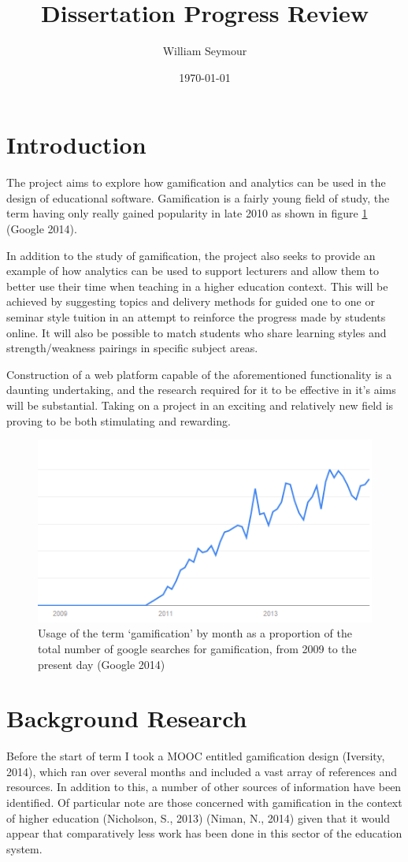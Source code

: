 \documentclass[10pt,a4paper]{report}
\author{William Seymour}
\title{Dissertation Progress Review}
\date{\today}
\begin{document}
\maketitle

\section*{Introduction}
The project aims to explore how gamification and analytics can be used in the design of educational software. Gamification is a fairly young field of study, the term having only really gained popularity in late 2010 as shown in figure \ref{usage} (Google 2014).

In addition to the study of gamification, the project also seeks to provide an example of how analytics can be used to support lecturers and allow them to better use their time when teaching in a higher education context. This will be achieved by suggesting topics and delivery methods for guided one to one or seminar style tuition in an attempt to reinforce the progress made by students online. It will also be possible to match students who share learning styles and strength/weakness pairings in specific subject areas.

Construction of a web platform capable of the aforementioned functionality is a daunting undertaking, and the research required for it to be effective in it's aims will be substantial. Taking on a project in an exciting and relatively new field is proving to be both stimulating and rewarding.
\begin{figure}
	\includegraphics{../img/usage-graph.png}
	\caption{Usage of the term `gamification' by month as a proportion of the total number of google searches for gamification, from 2009 to the present day (Google 2014)}
	\label{usage}
\end{figure}
\section*{Background Research}
Before the start of term I took a MOOC entitled gamification design (Iversity, 2014), which ran over several months and included a vast array of references and resources. In addition to this, a number of other sources of information have been identified. Of particular note are those concerned with gamification in the context of higher education (Nicholson, S., 2013) (Niman, N., 2014) given that it would appear that comparatively less work has been done in this sector of the education system.
\end{document}

